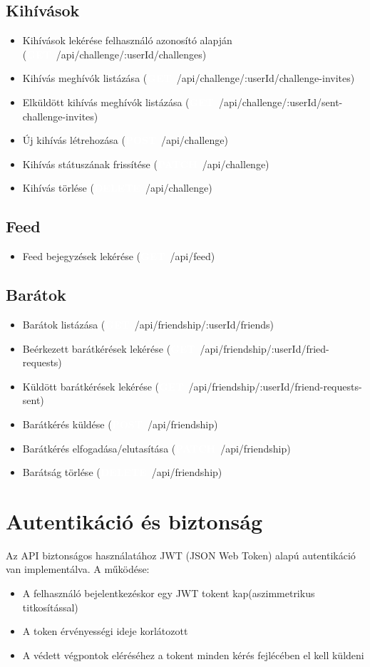 \documentclass[12pt]{report}
\newcommand{\httpGet}[1]{\colorbox{getColor}{\textbf{\textcolor{white}{GET}}}~#1}
\newcommand{\httpPost}[1]{\colorbox{postColor}{\textbf{\textcolor{white}{POST}}}~#1}
\newcommand{\httpPatch}[1]{\colorbox{patchColor}{\textbf{\textcolor{white}{PATCH}}}~#1}
\newcommand{\httpDelete}[1]{\colorbox{deleteColor}{\textbf{\textcolor{white}{DELETE}}}~#1}
\begin{document}
\subsection{Kihívások}
  \begin{itemize}
    \item Kihívások lekérése felhasználó azonosító alapján (\httpGet{/api/challenge/:userId/challenges})
    \item Kihívás meghívók listázása (\httpGet{/api/challenge/:userId/challenge-invites})
    \item Elküldött kihívás meghívók listázása (\httpGet{/api/challenge/:userId/sent-challenge-invites})
    \item Új kihívás létrehozása (\httpPost{/api/challenge})
    \item Kihívás státuszának frissítése (\httpPatch{/api/challenge})
    \item Kihívás törlése (\httpDelete{/api/challenge})
  \end{itemize}
\subsection{Feed}
  \begin{itemize}
    \item Feed bejegyzések lekérése (\httpGet{/api/feed})        
  \end{itemize}
\subsection{Barátok}
  \begin{itemize}
    \item Barátok listázása (\httpGet{/api/friendship/:userId/friends})
    \item Beérkezett barátkérések lekérése (\httpGet{/api/friendship/:userId/fried-requests})
    \item Küldött barátkérések lekérése (\httpGet{/api/friendship/:userId/friend-requests-sent})
    \item Barátkérés küldése (\httpPost{/api/friendship})
    \item Barátkérés elfogadása/elutasítása (\httpPatch{/api/friendship})
    \item Barátság törlése (\httpDelete{/api/friendship})
\end{itemize}

\section{Autentikáció és biztonság}
Az API biztonságos használatához JWT (JSON Web Token) alapú autentikáció van implementálva. A működése:
\begin{itemize}
  \item A felhasználó bejelentkezéskor egy JWT tokent kap(aszimmetrikus titkosítással)
  \item A token érvényességi ideje korlátozott
  \item A védett végpontok eléréséhez a tokent minden kérés fejlécében el kell küldeni
\end{itemize}
\end{document}
